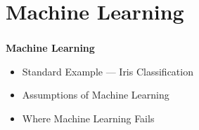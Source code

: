\documentclass[bigger,xcolor={x11names,svgnames}]{beamer}
\begin{document}
\section{Machine Learning}
%
\begin{frame}
    \frametitle{}
    \begin{center}
        \vfill
        {\huge\bf Machine Learning}
    \end{center}
    \vfill
    \begin{itemize}
        \item Standard Example --- Iris Classification
        \item Assumptions of Machine Learning
        \item Where Machine Learning Fails
    \end{itemize}
    \vfill
\end{frame}
%
\end{document}
